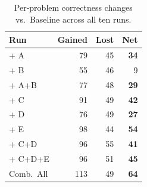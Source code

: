 \begin{table}[ht]
\centering
\caption{Per-problem correctness changes vs.\ Baseline across all ten runs.}
\label{tab:p4-gained-lost-full}
\begin{tabular}{lrrr}
\toprule
Run & Gained & Lost & Net \\
\midrule
+ A & 79 & 45 & \textbf{34} \\
+ B & 55 & 46 & 9 \\
+ A+B & 77 & 48 & \textbf{29} \\
\midrule
+ C & 91 & 49 & \textbf{42} \\
+ D & 76 & 49 & \textbf{27} \\
+ E & 98 & 44 & \textbf{54} \\
+ C+D & 96 & 55 & \textbf{41} \\
+ C+D+E & 96 & 51 & \textbf{45} \\
\midrule
Comb.\ All & 113 & 49 & \textbf{64} \\
\bottomrule
\end{tabular}
\end{table}